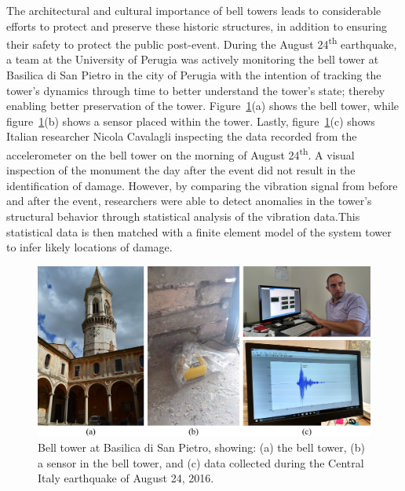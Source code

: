 \documentclass[12pt,letter]{article}
\begin{document}
\begin{vibration_case_study}
	The architectural and cultural importance of bell towers leads to considerable efforts to protect and preserve these historic structures, in addition to ensuring their safety to protect the public post-event. During the August 24\textsuperscript{th} earthquake, a team at the University of Perugia was actively monitoring the bell tower at Basilica di San Pietro in the city of Perugia with the intention of tracking the tower's dynamics through time to better understand the tower's state; thereby enabling better preservation of the tower.  Figure~\ref{fig:Italy_2016_earthquake_2}(a) shows the bell tower, while figure~\ref{fig:Italy_2016_earthquake_2}(b) shows a sensor placed within the tower. Lastly, figure~\ref{fig:Italy_2016_earthquake_2}(c) shows Italian researcher Nicola Cavalagli inspecting the data recorded from the accelerometer on the bell tower on the morning of August 24\textsuperscript{th}. A visual inspection of the monument the day after the event did not result in the identification of damage. However, by comparing the vibration signal from before and after the event, researchers were able to detect anomalies in the tower's structural behavior through statistical analysis of the vibration data.\protect\footnotemark[2] This statistical data is then matched with a finite element model of the system tower to infer likely locations of damage.  
	
	\begin{figure}[H]
		\centering
		\includegraphics[width=1\textwidth]{../figures/Italy_2016_earthquake_2}
		\caption{Bell tower at Basilica di San Pietro, showing: (a) the bell tower, (b) a sensor in the bell tower, and (c) data collected during the Central Italy earthquake of August 24, 2016.\protect\footnotemark[3] }
		\label{fig:Italy_2016_earthquake_2}
	\end{figure}

										
										
\end{vibration_case_study}
\end{document}
